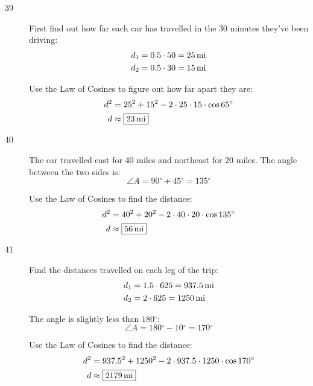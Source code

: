 \documentclass{exam}
\newcommand{\dg}{\ensuremath{^\circ}}
\begin{document}
\begin{description}
      \item[39]
        First find out how far each car has travelled in the 30 minutes they've been driving:
        \begin{align*}
          d_1 &= 0.5 \cdot 50 = \unit[25]{mi} \\
          d_2 &= 0.5 \cdot 30 = \unit[15]{mi} \\
        \end{align*}

        Use the Law of Cosines to figure out how far apart they are:
        \begin{align*}
          d^2 & = 25^2 + 15^2 - 2 \cdot 25 \cdot 15 \cdot \cos 65 \dg \\
          d   & \approx \boxed{ \unit[23]{mi} } \\
        \end{align*}

      \item[40]
        The car travelled east for 40 miles and northeast for 20 miles.  The angle between the two sides is:
        \[
          \angle A = 90 \dg + 45 \dg = 135 \dg
        \]

        Use the Law of Cosines to find the distance:
        \begin{align*}
          d^2 & = 40^2 + 20^2 - 2 \cdot 40 \cdot 20 \cdot \cos 135 \dg \\
          d   & \approx \boxed{ \unit[56]{mi} } \\
        \end{align*}

      \item[41]
        Find the distances travelled on each leg of the trip:
        \begin{align*}
          d_1 &= 1.5 \cdot 625 = \unit[937.5]{mi} \\
          d_2 &= 2 \cdot 625 = \unit[1250]{mi} \\
        \end{align*}

        The angle is slightly less than $180 \dg$:
        \[
          \angle A = 180 \dg - 10 \dg = 170 \dg
        \]

        Use the Law of Cosines to find the distance:
        \begin{align*}
          d^2 & = 937.5^2 + 1250^2 - 2 \cdot 937.5 \cdot 1250 \cdot \cos 170 \dg \\
          d   & \approx \boxed{ \unit[2179]{mi} } \\
        \end{align*}


\end{description}
\end{document}
